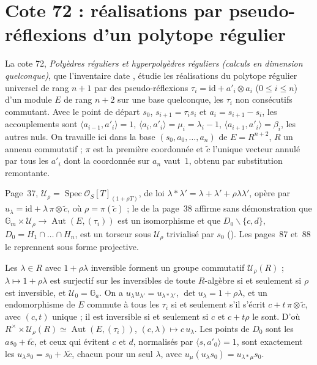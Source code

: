 \section[Cote 72 : réalisations par pseudo-réflexions d'un polytope régulier]{Cote 72 : réalisations par pseudo-réflexions d'un polytope régulier\protect{}}\label{sec:72}

La cote 72, \emph{Polyèdres réguliers et hyperpolyèdres réguliers (calculs en dimension quelconque)}, que l'inventaire date \q{[à partir de 1978]}, étudie les réalisations du polytope régulier universel de rang $n+1$ par des pseudo-réflexions $\tau_i = \mathrm{id} + a'_i \otimes a_i$ ($0 \leq i \leq n$) d'un module $E$ de rang $n+2$ sur une base quelconque, les $\tau_i$ non consécutifs commutant. Avec le point de départ $s_0$, $s_{i+1} = \tau_i s_i$ et $a_i = s_{i+1} - s_i$, les accouplements sont $\langle a_{i-1}, a'_i\rangle = 1$, $\langle a_i, a'_i\rangle = \mu_i = \lambda_i - 1$, $\langle a_{i+1}, a'_i\rangle = \beta_i$, les autres nuls. On travaille ici dans la base $(s_0, a_0, \dots, a_n)$ de $E = R^{n+2}$, $R$ un anneau commutatif ; $\pi$ est la première coordonnée et $\tilde c$ l'unique vecteur annulé par tous les $a'_i$ dont la coordonnée sur $a_n$ vaut~$1$, obtenu par substitution remontante.

Page~37, $\mathcal U_\rho = \operatorname{Spec} \mathcal O_S[T]_{(1+\rho T)}$, de loi $\lambda * \lambda' = \lambda + \lambda' + \rho\lambda\lambda'$, opère par $u_\lambda = \mathrm{id} + \lambda\, \pi \otimes \tilde c$, où $\rho = \pi(\tilde c)$ ; le  de la page~38 affirme sans démonstration que $\mathbb G_m \times \mathcal U_\rho \to \operatorname{Aut}(E, (\tau_i))$ est un isomorphisme et que $D_0 \smallsetminus \{c, d\}$, $D_0 = H_1 \cap \dots \cap H_n$, est un torseur sous $\mathcal U_\rho$ trivialisé par $s_0$ (). Les pages~87 et~88 le reprennent sous forme projective.

\begin{encadre}
\begin{theoreme}
Les $\lambda \in R$ avec $1 + \rho\lambda$ inversible forment un groupe commutatif $\mathcal U_\rho(R)$ ; $\lambda \mapsto 1 + \rho\lambda$ est surjectif sur les inversibles de toute $R$-algèbre si et seulement si $\rho$ est inversible, et $\mathcal U_0 = \mathbb G_a$. On a $u_\lambda u_{\lambda'} = u_{\lambda * \lambda'}$, $\det u_\lambda = 1 + \rho\lambda$, et un endomorphisme de $E$ commute à tous les $\tau_i$ si et seulement s'il s'écrit $c + t\, \pi \otimes \tilde c$, avec $(c, t)$ unique ; il est inversible si et seulement si $c$ et $c + t\rho$ le sont. D'où $R^\times \times \mathcal U_\rho(R) \simeq \operatorname{Aut}(E, (\tau_i))$, $(c, \lambda) \mapsto c\, u_\lambda$. Les points de $D_0$ sont les $a s_0 + t \tilde c$, et ceux qui évitent $c$ et $d$, normalisés par $\langle s, a'_0\rangle = 1$, sont exactement les $u_\lambda s_0 = s_0 + \lambda \tilde c$, chacun pour un seul $\lambda$, avec $u_\mu(u_\lambda s_0) = u_{\lambda * \mu} s_0$.
\end{theoreme}
\end{encadre}

